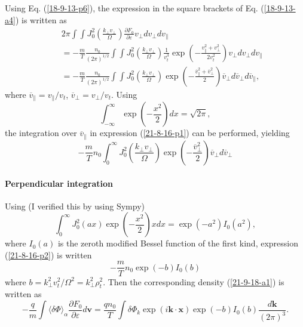 \documentclass{article}
\begin{document}
Using Eq. (\ref{18-9-13-p6}), the expression in the square brackets of Eq.
(\ref{18-9-13-a4}) is written as
\begin{eqnarray}
  &  & 2 \pi \int \int J_0^2 \left( \frac{k_{\perp} v_{\perp}}{\Omega}
  \right) \frac{\partial F_0}{\partial \varepsilon} v_{\perp} d v_{\perp} d
  v_{\parallel} \nonumber\\
  &  & = - \frac{m}{T} \frac{n_0}{(2 \pi)^{1 / 2}} \int \int J_0^2 \left(
  \frac{k_{\perp} v_{\perp}}{\Omega} \right) \frac{1}{v_t^3} \exp \left( -
  \frac{v^2_{\parallel} + v_{\perp}^2}{2 v_t^2} \right) v_{\perp} d v_{\perp}
  d v_{\parallel} \\
  &  & = - \frac{m}{T} \frac{n_0}{(2 \pi)^{1 / 2}} \int \int J_0^2 \left(
  \frac{k_{\perp} v_{\perp}}{\Omega} \right) \exp \left( -
  \frac{\overline{v}^2_{\parallel} + \overline{v}_{\perp}^2}{2} \right)
  \overline{v}_{\perp} d \overline{v}_{\perp} d \overline{v}_{\parallel}, 
  \label{21-8-16-p1}
\end{eqnarray}
where $\overline{v}_{\parallel} = v_{\parallel} / v_t$, $\overline{v}_{\perp}
= v_{\perp} / v_t$. Using
\begin{equation}
  \int_{- \infty}^{\infty} \exp \left( - \frac{x^2}{2} \right) d x = \sqrt{2
  \pi},
\end{equation}
the integration over $\overline{v}_{\parallel}$ in expression
(\ref{21-8-16-p1}) can be performed, yielding
\begin{equation}
  \label{21-8-16-p2} - \frac{m}{T} n_0 \int_0^{\infty} J_0^2 \left(
  \frac{k_{\perp} v_{\perp}}{\Omega} \right) \exp \left( -
  \frac{\overline{v}_{\perp}^2}{2} \right) \overline{v}_{\perp} d
  \overline{v}_{\perp}
\end{equation}

\paragraph{Perpendicular integration}

Using (I verified this by using Sympy)
\begin{equation}
  \int_0^{\infty} J_0^2 (a x) \exp \left( - \frac{x^2}{2} \right) x d x = \exp
  (- a^2) I_0 (a^2),
\end{equation}
where $I_0 (a)$ is the zeroth modified Bessel function of the first kind,
expression (\ref{21-8-16-p2}) is written
\begin{equation}
  - \frac{m}{T} n_0 \exp (- b) I_0 (b)
\end{equation}
where $b = k_{\perp}^2 v_t^2 / \Omega^2 = k_{\perp}^2 \rho^2_t$. Then the
corresponding density (\ref{21-9-18-a1}) is written as
\begin{equation}
  \label{18-9-13-p7} - \frac{q}{m} \int \langle \delta \Phi \rangle_{\alpha}
  \frac{\partial F_0}{\partial \varepsilon} d\mathbf{v}= \frac{q n_0}{T}  \int
  \delta \Phi_k \exp (i\mathbf{k} \cdot \mathbf{x}) \exp (- b) I_0 (b)
  \frac{d\mathbf{k}}{(2 \pi)^3} .
\end{equation}
\end{document}
